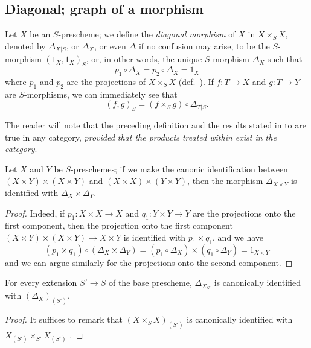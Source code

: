 \subsection{Diagonal; graph of a morphism}
\label{subsection-diagonal-graph-of-a-morphism}

\begin{env}[5.3.1]
\label{1.5.3.1}
Let $X$ be an $S$-prescheme;
we define the \emph{diagonal morphism} of $X$ in $X\times_S X$, denoted by $\Delta_{X|S}$, or $\Delta_X$, or even $\Delta$ if no confusion may arise, to be the $S$-morphism $(1_X,1_X)_S$, or, in other words, the unique $S$-morphism $\Delta_X$ such that
\[
    p_1\circ\Delta_X = p_2\circ\Delta_X = 1_X\tag{5.3.1.1}
\]
where $p_1$ and $p_2$ are the projections of $X\times_S X$ (def.~).
If $f:T\to X$ and $g:T\to Y$ are $S$-morphisms, we can immediately see that
\[
    (f,g)_S = (f\times_S g)\circ\Delta_{T|S}.\tag{5.3.1.2}
\]

The reader will note that the preceding definition and the results stated in  to  are true in any category, \emph{provided that the products treated within exist in the category}.
\end{env}

\begin{prop}[5.3.2]
\label{1.5.3.2}
Let $X$ and $Y$ be $S$-preschemes;
if we make the canonic identification between $(X\times Y)\times(X\times Y)$ and $(X\times X)\times(Y\times Y)$, then the morphism $\Delta_{X\times Y}$ is identified with $\Delta_X\times\Delta_Y$.
\end{prop}

\begin{proof}
\label{proof-1.5.3.2}
Indeed, if $p_1:X\times X\to X$ and $q_1:Y\times Y\to Y$ are the projections onto the first component, then the projection onto the first component $(X\times Y)\times(X\times Y)\to X\times Y$ is identified with $p_1\times q_1$, and we have
\[
    (p_1\times q_1)\circ(\Delta_X\times\Delta_Y) = (p_1\circ\Delta_X)\times(q_1\circ\Delta_Y) = 1_{X\times Y}
\]
and we can argue similarly for the projections onto the second component.
\end{proof}

\begin{cor}[5.3.4]
\label{1.5.3.4}
For every extension $S'\to S$ of the base prescheme, $\Delta_{X_{S'}}$ is canonically identified with $(\Delta_X)_{(S')}$.
\end{cor}

\begin{proof}
\label{proof-1.5.3.4}
It suffices to remark that $(X\times_S X)_{(S')}$ is canonically identified with $X_{(S')}\times_{S'}X_{(S')}$ .
\end{proof}

